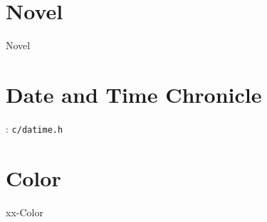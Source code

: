 
\section{Novel}
{Novel}

\section{Date and Time Chronicle}

: \verb`c/datime.h`

\section{Color}
{xx-Color}


